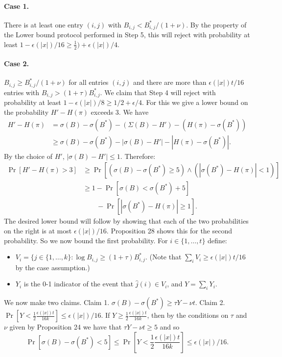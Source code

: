\documentclass[10pt,a4paper]{article}
\begin{document}
\paragraph{Case 1.} There is at least one entry $(i,j)$ with $B_{i,j}<B^*_{i,j}/(1+\nu)$. By the property of the Lower bound protocol performed in Step 5, this will reject with probability at least $1-\epsilon(|x|)/16\ge\frac12)+\epsilon(|x|)/4$.
\paragraph{Case 2.} $B_{i,j}\ge B^*_{i,j}/(1+\nu)$ for all entries $(i,j)$ and there are more than $\epsilon(|x|)t/16$ entries with $B_{i,j}>(1+\tau)B^*_{i,j}$. We claim that Step 4 will reject with probability at least $1-\epsilon(|x|)/8\ge1/2+\epsilon/4$. For this we give a lower bound on the probability $H'-H(\pi)$ exceeds 3. We have
\begin{align*}H'-H(\pi)&=\sigma(B)-\sigma(B^*)-(\Sigma(B)-H')-(H(\pi)-\sigma(B^*))\\
&\ge\sigma(B)-\sigma(B^*)-|\sigma(B)-H'|-|H(\pi)-\sigma(B^*)|.\end{align*}
By the choice of $H'$, $|\sigma(B)-H'|\le1$. Therefore:
\begin{align*}\Pr[H'-H(\pi)>3]&\ge\Pr[(\sigma(B)-\sigma(B^*)\ge5)\land(|\sigma(B^*)-H(\pi)|<1)]\\
&\ge1-\Pr[\sigma(B)<\sigma(B^*)+5]\\&\qquad-\Pr[|\sigma(B^*)-H(\pi)|\ge1].\end{align*}
The desired lower bound will follow by showing that each of the two probabilities on the right is at most $\epsilon(|x|)/16$. Proposition 28 shows this for the second probability. So we now bound the first probability. For $i\in\{1,\ldots,t\}$ define:
\begin{itemize}\item $V_i=\{j\in\{1,\ldots,k\}:\log B_{i,j}\ge(1+\tau)B^*_{i,j}$. (Note that $\sum_i V_i\ge\epsilon(|x|)t/16$ by the case assumption.)
\item $Y_i$ is the 0-1 indicator of the event that $\hat j(i)\in V_i$, and $Y=\sum_iY_i$.\end{itemize}
We now make two claims. Claim 1. $\sigma(B)-\sigma(B^*)\ge\tau Y-\nu t$. Claim 2. $\Pr[Y<\frac12\frac{\epsilon(|x|)t}{16k}]\le\epsilon(|x|)/16$.
If $Y\ge\frac12\frac{\epsilon(|x|)t}{16k}$, then by the conditions on $\tau$ and $\nu$ given by Proposition 24 we have that $\tau Y-\nu t\ge5$ and so
\[\Pr[\sigma(B)-\sigma(B^*)<5]\le\Pr\left[Y<\frac12\frac{\epsilon(|x|)t}{16k}\right]\le\epsilon(|x|)/16.\]
\end{document}
